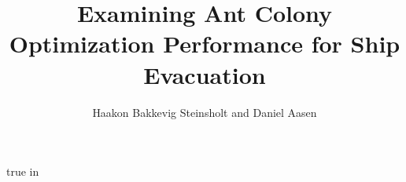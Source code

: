 \documentclass[12pt,letterpaper,final]{report}
\author{Haakon Bakkevig Steinsholt and Daniel Aasen}
\title{Examining Ant Colony Optimization Performance for Ship Evacuation}
\theoremstyle{definition}
\begin{document}
    \maketitle

    \newpage    
    

    \tableofcontents
    \listoffigures
    \listoftables

     true in

    \newpage

        
                
    
    
    

    \begin{singlespace}
        
        
    \end{singlespace}

    \printglossary   
\end{document}
